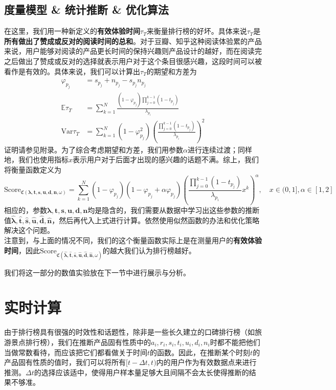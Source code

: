 \documentclass[UTF8]{ctexart}
\theoremstyle{plain}
\theoremstyle{definition}
\theoremstyle{remark}
\begin{document}
	\subsection{度量模型 \& 统计推断 \& 优化算法}
	在这里，我们用一种新定义的\textbf{有效体验时间}$\tau_T$来衡量排行榜的好坏。具体来说$\tau_T$是\textbf{所有做出了赞成或反对的阅读时间的总和}。对于豆瓣、知乎这种阅读体验累的产品来说，用户能够对阅读的产品更长时间的保持兴趣则产品设计的越好，而在阅读完之后做出了赞成或反对的选择就表示用户对于这个条目很感兴趣，这段时间可以被看作是有效的。具体来说，我们可以计算出$\tau_T$的期望和方差为
	\begin{equation} \label{EQ_C}
	\begin{aligned}
	\varphi_{p_j} & = s_{p_j} + n_{p_j} - s_{p_j}n_{p_j} \\
	\mathbb{E} \tau_T & = \sum_{k=1}^N \frac{(1-\varphi_{p_j})\prod\limits_{j=0}^{k-1}(1-t_{p_j})}{\lambda_{p_i}} \\
	\mathrm{Var} \tau_T & = \sum_{k=1}^N (1-\varphi_{p_j}^2)\left(\frac{\prod\limits_{j=0}^{k-1}(1-t_{p_j})}{\lambda_{p_i}}\right)^2
	\end{aligned}
	\end{equation}
	证明请参见附录。为了综合考虑期望和方差，我们用参数$\alpha$进行连续过渡；同样地，我们也使用指标$x$表示用户对于后面才出现的感兴趣的话题不满。综上，我们将衡量函数定义为
	\begin{equation}
	\mathrm{Score}_{\mathfrak{C}\left(\bm{\lambda}, \bm{t}, \bm{s}, \bm{u}, \bm{d}, \bm{n},\omega\right)} = \sum_{k=1}^N (1-\varphi_{p_j})(1-\varphi_{p_j}+\alpha \varphi_{p_j})\left(\frac{\prod\limits_{j=0}^{k-1}(1-t_{p_j})}{\lambda_{p_i}} x^k\right)^\alpha, \quad x \in (0, 1], \alpha \in [1, 2]
	\end{equation}
	相应的，参数$\bm{\lambda}, \bm{t}, \bm{s}, \bm{u}, \bm{d}, \bm{n}$均是隐含的，我们需要从数据中学习出这些参数的推断值$\bm{\hat{\lambda}}, \bm{\hat{t}}, \bm{\hat{s}}, \bm{\hat{u}}, \bm{\hat{d}}, \bm{\hat{n}}$，然后再代入上式进行计算。依然使用似然函数的办法和优化策略解决这个问题。 \\
	
	注意到，与上面的情况不同，我们的这个衡量函数实际上是在测量用户的\textbf{有效体验时间}，因此$\mathrm{Score}_{\mathfrak{C}\left(\bm{\hat{\lambda}}, \bm{\hat{t}}, \bm{\hat{s}}, \bm{\hat{u}}, \bm{\hat{d}}, \bm{\hat{n}},\omega\right)}$的越大我们认为排行榜越好。
	
	我们将这一部分的数值实验放在下一节中进行展示与分析。
	
	\section{实时计算}
	由于排行榜具有很强的时效性和话题性，除非是一些长久建立的口碑排行榜（如旅游景点排行榜），我们在推断产品固有性质中的$a_i,r_i,s_i,t_i,u_i,d_i,n_i$时都不能把他们当做常数看待，而应该把它们都看做关于时间$t$的函数。因此，在推断某个时刻$t$的产品固有性质的值时，我们可以将所有$[t-\Delta t,t)$内的用户作为有效数据点来进行推测。$\Delta t$的选择应该适中，使得用户样本量足够大且间隔不会太长使得推断的结果不够准。
\end{document}
